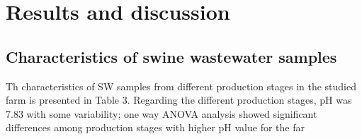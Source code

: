 \section{Results and discussion}
\subsection{Characteristics of swine wastewater samples}
Th characteristics of SW samples from different production stages in the studied farm is presented in Table 3. Regarding the different production stages, pH was 7.83 with some variability; one way ANOVA analysis showed significant differences among production stages with higher pH value for the far